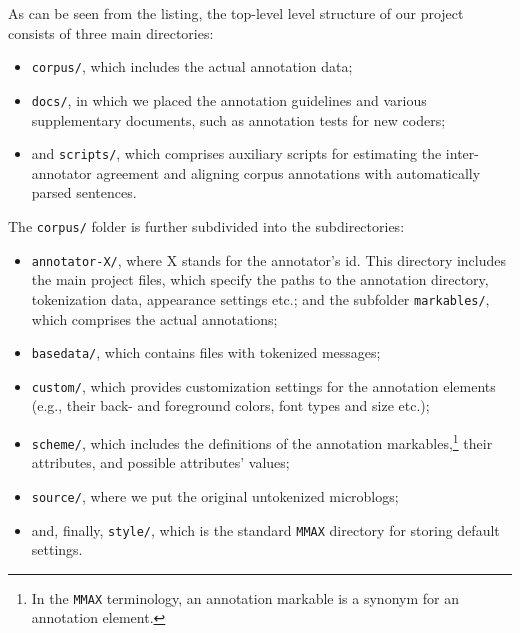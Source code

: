 As can be seen from the listing, the top-level level structure of our
project consists of three main directories:
  \begin{itemize}
  \item\texttt{corpus/}, which includes the actual annotation data;

  \item\texttt{docs/}, in which we placed the annotation guidelines and
    various supplementary documents, such as annotation tests for new
    coders;

  \item and \texttt{scripts/}, which comprises auxiliary scripts for
    estimating the inter-annotator agreement and aligning corpus
    annotations with automatically parsed sentences.
  \end{itemize}

{
  \setlength{\linewidth}{\textwidth}
  The \texttt{corpus/} folder is further subdivided into the
  subdirectories:
  \begin{itemize}
  \item\texttt{annotator-X/}, where X stands for the annotator's id.
    This directory includes the main project files, which specify the
    paths to the annotation directory, tokenization data, appearance
    settings etc.; and the subfolder \texttt{markables/}, which
    comprises the actual annotations;

  \item\texttt{basedata/}, which contains files with tokenized messages;

  \item\texttt{custom/}, which provides customization settings for the
    annotation elements (e.g., their back- and foreground colors, font
    types and size etc.);

  \item\texttt{scheme/}, which includes the definitions of the
    annotation markables,\footnote{In the \texttt{MMAX} terminology, an
      annotation markable is a synonym for an annotation element.}
    their attributes, and possible attributes' values;

  \item\texttt{source/}, where we put the original untokenized
    microblogs;

  \item and, finally, \texttt{style/}, which is the standard
    \texttt{MMAX} directory for storing default settings.
  \end{itemize}
}


